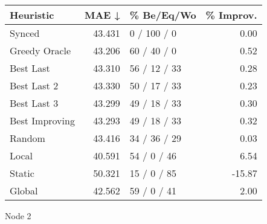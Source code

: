 \begin{tabular}{lrlr}
\toprule
\textbf{Heuristic} & \textbf{MAE ↓} & \textbf{\% Be/Eq/Wo} & \textbf{\% Improv.} \\
\midrule
            Synced &         43.431 &          0 / 100 / 0 &                0.00 \\
     Greedy Oracle &         43.206 &          60 / 40 / 0 &                0.52 \\
         Best Last &         43.310 &         56 / 12 / 33 &                0.28 \\
       Best Last 2 &         43.330 &         50 / 17 / 33 &                0.23 \\
       Best Last 3 &         43.299 &         49 / 18 / 33 &                0.30 \\
    Best Improving &         43.293 &         49 / 18 / 33 &                0.32 \\
            Random &         43.416 &         34 / 36 / 29 &                0.03 \\
             Local &         40.591 &          54 / 0 / 46 &                6.54 \\
            Static &         50.321 &          15 / 0 / 85 &              -15.87 \\
            Global &         42.562 &          59 / 0 / 41 &                2.00 \\
\bottomrule
\end{tabular}
\caption{Node 2}
\label{tab:iid_lr01_le1_bs4_2}
